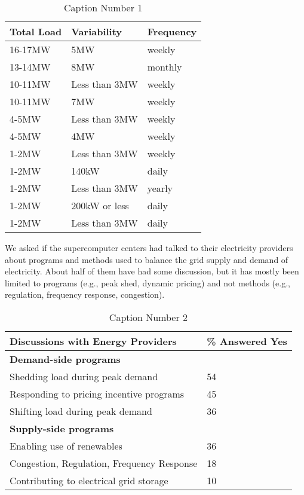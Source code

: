 \begin{table}[htbp]

\begin{center}
\caption{Caption Number 1}
\begin{tabular}{|p{65pt}|l|l|}
\hline
\textbf{Total Load}&
\textbf{Variability}&
\textbf{Frequency} \\
\hline
16-17MW&
5MW&
weekly \\
\hline
13-14MW&
8MW&
monthly \\
\hline
10-11MW&
Less than 3MW&
weekly \\
\hline
10-11MW&
7MW&
weekly \\
\hline
4-5MW&
Less than 3MW&
weekly \\
\hline
4-5MW&
4MW&
weekly \\
\hline
1-2MW&
Less than 3MW&
weekly \\
\hline
1-2MW&
140kW&
daily \\
\hline
1-2MW&
Less than 3MW&
yearly \\
\hline
1-2MW&
200kW or less&
daily \\
\hline
1-2MW&
Less than 3MW&
daily \\
\hline
\end{tabular}
\label{tab1}
\end{center}
\end{table}

We asked if the supercomputer centers had talked to their electricity
providers about programs and methods used to balance the grid supply and
demand of electricity. About half of them have had some discussion, but it
has mostly been limited to programs (e.g., peak shed, dynamic pricing) 
and not methods (e.g., regulation, frequency response, congestion).


\begin{table}[htbp]

\begin{center}
\caption{Caption Number 2}
\begin{tabular}{|p{230pt}|l|}
\hline
\textbf{Discussions with Energy Providers}&
{\%} Answered Yes \\
\hline
\textbf{Demand-side programs}&
~ \\
\hline
Shedding load during peak demand&
54 \\
\hline
Responding to pricing incentive programs&
45 \\
\hline
Shifting load during peak demand&
36 \\
\hline
\textbf{Supply-side programs}&
~ \\
\hline
Enabling use of renewables&
36 \\
\hline
Congestion, Regulation, Frequency Response&
18 \\
\hline
Contributing to electrical grid storage&
10 \\
\hline
\end{tabular}
\label{tab2}
\end{center}
\end{table}

